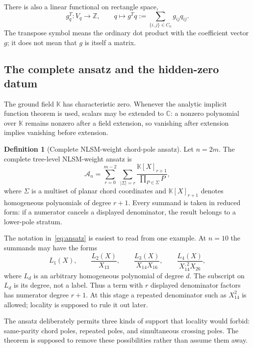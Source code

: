 \documentclass[11pt]{article}
\theoremstyle{definition}
\newtheorem{definition}[theorem]{Definition}
\newcommand{\K}{\mathbb K}
\newcommand{\Z}{\mathbb Z}
\newcommand{\C}{\mathbb C}
\begin{document}
There is also a linear functional on rectangle space,
\begin{equation}
g_q^T:V_q\longrightarrow\Z,
\qquad
q\longmapsto g^Tq:=\sum_{\{i,j\}\in C_n}g_{ij}q_{ij}.
\label{eq:gtranspose}
\end{equation}
The transpose symbol means the ordinary dot product with the coefficient vector $g$; it does not mean that $g$ is itself a matrix.

\subsection{The complete ansatz and the hidden-zero datum}

The ground field $\K$ has characteristic zero.  Whenever the analytic implicit function theorem is used, scalars may be extended to $\C$: a nonzero polynomial over $\K$ remains nonzero after a field extension, so vanishing after extension implies vanishing before extension.

\begin{definition}[Complete NLSM-weight chord-pole ansatz]
Let $n=2m$.  The complete tree-level NLSM-weight ansatz is
\begin{equation}
\mathcal A_n
=
\sum_{r=0}^{m-2}
\ \sum_{|\Sigma|=r}
\frac{\K[X]_{r+1}}{\prod_{P\in\Sigma}P},
\label{eq:ansatz}
\end{equation}
where $\Sigma$ is a multiset of planar chord coordinates and $\K[X]_{r+1}$ denotes homogeneous polynomials of degree $r+1$.  Every summand is taken in reduced form: if a numerator cancels a displayed denominator, the result belongs to a lower-pole stratum.
\end{definition}

The notation in~\eqref{eq:ansatz} is easiest to read from one example.  At
$n=10$ the summands may have the forms
\[
L_1(X),\qquad
\frac{L_2(X)}{X_{13}},\qquad
\frac{L_3(X)}{X_{14}X_{16}},\qquad
\frac{L_4(X)}{X_{14}^{,2}X_{26}},
\]
where $L_d$ is an arbitrary homogeneous polynomial of degree $d$.  The
subscript on $L_d$ is its degree, not a label.  Thus a term with $r$
displayed denominator factors has numerator degree $r+1$.  At this stage a
repeated denominator such as $X_{14}^2$ is allowed; locality is supposed to
rule it out later.

The ansatz deliberately permits three kinds of support that locality would forbid: same-parity chord poles, repeated poles, and simultaneous crossing poles.  The theorem is supposed to remove these possibilities rather than assume them away.
\end{document}
